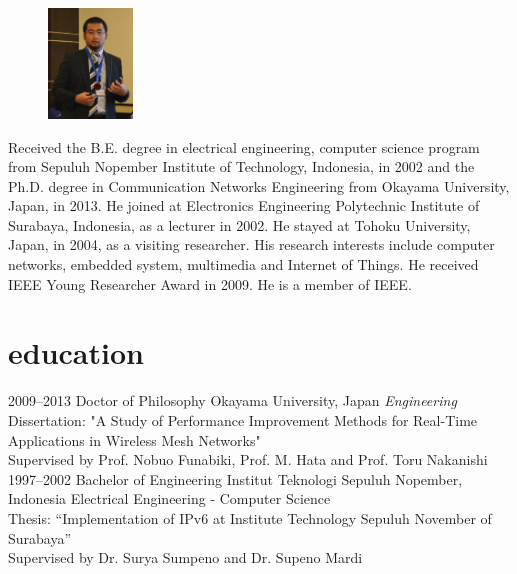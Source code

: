 \documentclass[style=verbose,maxnames=99,sorting=ydnt,backend=biber]{friggeri-cv} %
\begin{document}
\begin{figure}
	\vspace{-10pt}
	\begin{center}
    \includegraphics[width=0.2\textwidth]{dhoto-jas.jpg}
    \end{center}
    
\end{figure}
Received the B.E. degree in electrical engineering, computer science program from Sepuluh Nopember Institute of Technology, Indonesia, in 2002 and the Ph.D. degree in Communication Networks Engineering from Okayama University, Japan, in 2013. He joined at Electronics Engineering Polytechnic Institute of Surabaya, Indonesia, as a lecturer in 2002. He stayed at Tohoku University, Japan, in 2004, as a visiting researcher. His research interests include computer networks, embedded system, multimedia and Internet of Things. He received IEEE Young Researcher Award in 2009. He is a member of IEEE.



\section{education}

\begin{entrylist}
\entry
{2009--2013}
{Doctor {\normalfont of Philosophy}}
{Okayama University, Japan}
{\emph{Engineering} \\ 
Dissertation: "A Study of Performance Improvement Methods for Real-Time Applications in Wireless Mesh Networks" \\
Supervised by Prof. Nobuo Funabiki, Prof. M. Hata and Prof. Toru Nakanishi}
\entry
{1997--2002}
{Bachelor {\normalfont of Engineering}}
{Institut Teknologi Sepuluh Nopember, Indonesia}
{Electrical Engineering - Computer Science\\
Thesis: “Implementation of IPv6 at Institute Technology Sepuluh November of Surabaya” 
\\Supervised by Dr. Surya Sumpeno and Dr. Supeno Mardi
}

\end{entrylist}
\end{document}
